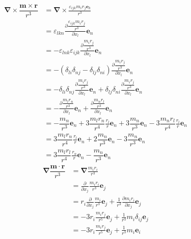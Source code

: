\begin{align*}
    \boldsymbol{\nabla}\times \dfrac{\boldsymbol{m}\times\boldsymbol{r}}{r^3}
    &=\boldsymbol{\nabla}\times \frac{\varepsilon_{ijk}m_ir_j\boldsymbol e_k}{r^3}\\
    &=\varepsilon_{lkn}\frac{\partial \dfrac{\varepsilon_{ijk}m_ir_j}{r^3}}{\partial x_l}\boldsymbol e_n\\
    &=-\varepsilon_{lnk}\varepsilon_{ijk}\frac{\partial \dfrac{m_ir_j}{r^3}}{\partial x_l}\boldsymbol e_n\\
    &=-(\delta_{li}\delta_{nj}-\delta_{lj}\delta_{ni})\frac{\partial \dfrac{m_ir_j}{r^3}}{\partial x_l}\boldsymbol e_n\\
    &=-\delta_{li}\delta_{nj}\frac{\partial \dfrac{m_ir_j}{r^3}}{\partial x_l}\boldsymbol e_n
    +\delta_{lj}\delta_{ni}\frac{\partial \dfrac{m_ir_j}{r^3}}{\partial x_l}\boldsymbol e_n\\
    &=-\frac{\partial \dfrac{m_lr_n}{r^3}}{\partial x_l}\boldsymbol e_n
    +\frac{\partial \dfrac{m_nr_l}{r^3}}{\partial x_l}\boldsymbol e_n\\
    &=-\dfrac{m_n}{r^3}\boldsymbol e_n
    +3\dfrac{m_lr_n}{r^4}\frac{r_l}{r}\boldsymbol e_n
    +3\dfrac{m_n}{r^3}\boldsymbol e_n
    -3\dfrac{m_nr_l}{r^4}\frac{r_l}{r}\boldsymbol e_n\\
    &=3\dfrac{m_lr_n}{r^4}\frac{r_l}{r}\boldsymbol e_n
    +2\dfrac{m_n}{r^3}\boldsymbol e_n
    -3\dfrac{m_n}{r^3}\boldsymbol e_n\\
    &=3\dfrac{m_lr_l}{r^4}\frac{r_n}{r}\boldsymbol e_n
    -\dfrac{m_n}{r^3}\boldsymbol e_n
\end{align*}
\begin{align*}
    \boldsymbol{\nabla}\dfrac{\boldsymbol{m}\cdot\boldsymbol{r}}{r^3}
    &= \boldsymbol{\nabla}\frac{m_ir_i}{r^3}\\
    &= \frac{\partial }{\partial x_j}\frac{m_ir_i}{r^3}\boldsymbol{e}_j\\
    &= r_i\frac{\partial }{\partial x_j}\frac{m_i}{r^3}\boldsymbol{e}_j
    +\frac{1}{r^3}\frac{\partial m_ir_i}{\partial x_j}\boldsymbol{e}_j\\
    &= -3r_i\frac{m_i r_j}{r^5}\boldsymbol{e}_j
    +\frac{1}{r^3}m_i\delta_{ij}\boldsymbol{e}_j\\
    &= -3r_i\frac{m_i r_j}{r^5}\boldsymbol{e}_j
    +\frac{1}{r^3}m_i\boldsymbol{e}_i
\end{align*}
